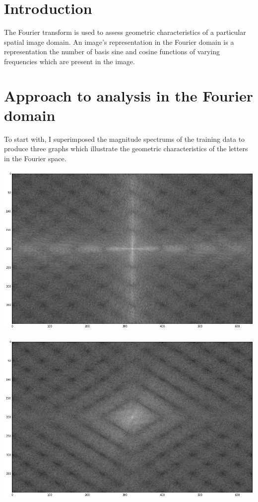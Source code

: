 \documentclass[12px]{article}
\begin{document}
\begin{flushleft}
\section{Introduction}

The Fourier transform is used to assess geometric characteristics of a particular spatial
image domain. An image's representation in the Fourier domain is a representation the number
of basis sine and cosine functions of varying frequencies which are present in the image.

\smallskip

\section{Approach to analysis in the Fourier domain}


To start with, I superimposed the magnitude spectrums of the training data to produce
three graphs which illustrate the geometric characteristics of the letters in the Fourier
space.


\includegraphics[scale=0.25]{fourierT}

\includegraphics[scale=0.25]{fourierS}


\end{flushleft}
\end{document}
